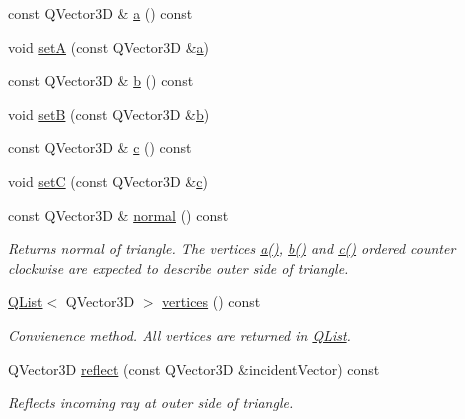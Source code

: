 \begin{DoxyCompactItemize}
\item 
const Q\+Vector3\+D \& \hyperlink{class_triangle_a430bf0a9d8eaf20ea7bdefcd8082588c}{a} () const 
\item 
void \hyperlink{class_triangle_a24c012d83d7e6c5d0b27985d8dcb64da}{set\+A} (const Q\+Vector3\+D \&\hyperlink{class_triangle_a430bf0a9d8eaf20ea7bdefcd8082588c}{a})
\item 
const Q\+Vector3\+D \& \hyperlink{class_triangle_a8327124c9b9b752be94187c9fbf3f460}{b} () const 
\item 
void \hyperlink{class_triangle_a9f889b49a5ea3b4be4c4366c63673095}{set\+B} (const Q\+Vector3\+D \&\hyperlink{class_triangle_a8327124c9b9b752be94187c9fbf3f460}{b})
\item 
const Q\+Vector3\+D \& \hyperlink{class_triangle_a61f6c0245df276555de6d1b1a98840b8}{c} () const 
\item 
void \hyperlink{class_triangle_af4566995b306c0f9ae72b457b7acb983}{set\+C} (const Q\+Vector3\+D \&\hyperlink{class_triangle_a61f6c0245df276555de6d1b1a98840b8}{c})
\item 
const Q\+Vector3\+D \& \hyperlink{class_triangle_aa1ccf6af0c2567e53b9dc6f51243f934}{normal} () const 
\begin{DoxyCompactList}\small\item\em Returns normal of triangle. The vertices \hyperlink{class_triangle_a430bf0a9d8eaf20ea7bdefcd8082588c}{a()}, \hyperlink{class_triangle_a8327124c9b9b752be94187c9fbf3f460}{b()} and \hyperlink{class_triangle_a61f6c0245df276555de6d1b1a98840b8}{c()} ordered counter clockwise are expected to describe outer side of triangle. \end{DoxyCompactList}\item 
\hyperlink{class_q_list}{Q\+List}$<$ Q\+Vector3\+D $>$ \hyperlink{class_triangle_a66da12d2c747c435ea5148df472d9229}{vertices} () const 
\begin{DoxyCompactList}\small\item\em Convienence method. All vertices are returned in \hyperlink{class_q_list}{Q\+List}. \end{DoxyCompactList}\item 
Q\+Vector3\+D \hyperlink{class_triangle_a4fb81ac7e355c97a03f4c056bd79ac99}{reflect} (const Q\+Vector3\+D \&incident\+Vector) const 
\begin{DoxyCompactList}\small\item\em Reflects incoming ray at outer side of triangle. \end{DoxyCompactList}\end{DoxyCompactItemize}
